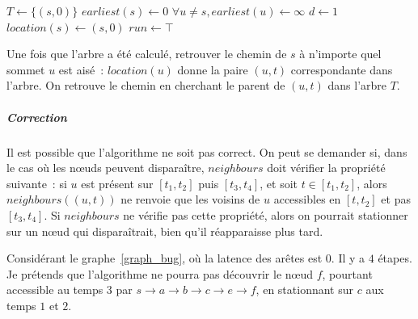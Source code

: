 \documentclass[12pt,a4paper]{article}
\begin{document}
\begin{algorithm}[H]
  \(T \leftarrow \{(s, 0)\}\)\;
  \(earliest(s) \leftarrow 0\)\;
  \(\forall u \neq s, earliest(u) \leftarrow \infty\)\;
  \(d \leftarrow 1\)\;
  \(location(s) \leftarrow (s, 0)\)\;
  \(run \leftarrow \top\)\;
\end{algorithm}

Une fois que l'arbre a été calculé, retrouver le chemin de \(s\) à
n'importe quel sommet \(u\) est aisé~: \(location(u)\) donne la paire
\((u, t)\) correspondante dans l'arbre. On retrouve le chemin en
cherchant le parent de \((u, t)\) dans l'arbre \(T\).

\subparagraph{Correction} Il est possible que l'algorithme ne soit pas
correct. On peut se demander si, dans le cas où les nœuds peuvent
disparaître, \(neighbours\) doit vérifier la propriété suivante~: si
\(u\) est présent sur \([t_1, t_2]\) puis \([t_3, t_4]\), et soit
\(t \in [t_1, t_2]\), alors \(neighbours((u, t))\) ne renvoie que les
voisins de \(u\) accessibles en \([t, t_2]\) et pas \([t_3, t_4]\). Si
\(neighbours\) ne vérifie pas cette propriété, alors on pourrait
stationner sur un nœud qui disparaîtrait, bien qu'il réapparaisse plus
tard.

Considérant le graphe~\ref{graph_bug}, où la latence des arêtes est
\(0\). Il y a \(4\) étapes. Je prétends que l'algorithme ne pourra pas
découvrir le nœud \(f\), pourtant accessible au temps 3 par
\(s \rightarrow a \rightarrow b \rightarrow c \rightarrow e
\rightarrow f\), en stationnant sur \(c\) aux temps \(1\) et \(2\).
\end{document}
